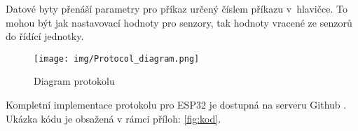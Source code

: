 Datové byty přenáší parametry pro příkaz určený číslem příkazu v~hlavičce.
To mohou být jak nastavovací hodnoty pro senzory, tak hodnoty vracené ze senzorů do řídící jednotky.

\begin{figure}[h]
    \begin{small}
        \begin{center}
            \texttt{[image: img/Protocol\_diagram.png]}
        \end{center}
        \caption{Diagram protokolu}
        \label{fig: Diagram protokolu}
    \end{small}
\end{figure}




Kompletní implementace protokolu pro ESP32 je dostupná na serveru Github \cite{protocol}.
Ukázka kódu je obsažená v rámci příloh: \ref{fig:kod}.

